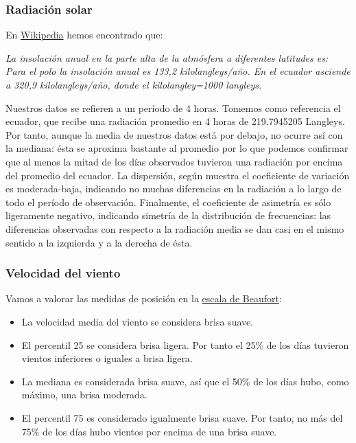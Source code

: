 \documentclass[
]{article}
\providecommand{\tightlist}{%
  \setlength{\itemsep}{0pt}\setlength{\parskip}{0pt}}
\begin{document}
\hypertarget{radiaciuxf3n-solar}{%
\subsubsection{Radiación solar}\label{radiaciuxf3n-solar}}

En \href{https://es.wikipedia.org/wiki/Langley}{Wikipedia} hemos
encontrado que:

\emph{La insolación anual en la parte alta de la atmósfera a diferentes
latitudes es: Para el polo la insolación anual es 133,2
kilolangleys/año. En el ecuador asciende a 320,9 kilolangleys/año, donde
el kilolangley=1000 langleys.}

Nuestros datos se refieren a un período de 4 horas. Tomemos como
referencia el ecuador, que recibe una radiación promedio en 4 horas de
219.7945205 Langleys. Por tanto, aunque la media de nuestros datos está
por debajo, no ocurre así con la mediana: ésta se aproxima bastante al
promedio por lo que podemos confirmar que al menos la mitad de los días
observados tuvieron una radiación por encima del promedio del ecuador.
La dispersión, según muestra el coeficiente de variación es
moderada-baja, indicando no muchas diferencias en la radiación a lo
largo de todo el período de observación. Finalmente, el coeficiente de
asimetría es sólo ligeramente negativo, indicando simetría de la
distribución de frecuencias: las diferencias observadas con respecto a
la radiación media se dan casi en el mismo sentido a la izquierda y a la
derecha de ésta.

\hypertarget{velocidad-del-viento}{%
\subsubsection{Velocidad del viento}\label{velocidad-del-viento}}

Vamos a valorar las medidas de posición en la
\href{https://en.wikipedia.org/wiki/Beaufort_scale}{escala de Beaufort}:

\begin{itemize}
\tightlist
\item
  La velocidad media del viento se considera brisa suave.
\item
  El percentil 25 se considera brisa ligera. Por tanto el 25\% de los
  días tuvieron vientos inferiores o iguales a brisa ligera.
\item
  La mediana es considerada brisa suave, así que el 50\% de los días
  hubo, como máximo, una brisa moderada.
\item
  El percentil 75 es considerado igualmente brisa suave. Por tanto, no
  más del 75\% de los días hubo vientos por encima de una brisa suave.
\end{itemize}
\end{document}
